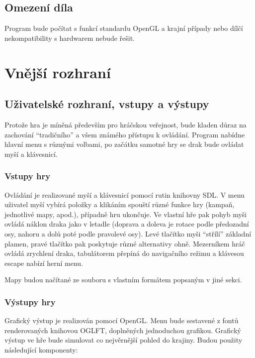 \documentclass{article}
\begin{document}
\subsection{Omezení díla}

Program bude počítat s funkcí standardu OpenGL a krajní případy nebo dílčí nekompatibility s hardwarem nebude řešit.

\section{Vnější rozhraní}

\subsection{Uživatelské rozhraní, vstupy a výstupy}

Protože hra je míněná především pro hráčskou veřejnost, bude kladen důraz na zachování ``tradičního'' a všem známého přístupu k ovládání. Program nabídne hlavní menu s různými volbami, po začátku samotné hry se drak bude ovládat myší a klávesnicí. 

\subsubsection{Vstupy hry}

Ovládání je realizované myší a klávesnicí pomocí rutin knihovny SDL. V menu uživatel myší vybírá položky a klikáním spouští různé funkce hry (kampaň, jednotlivé mapy, apod.), případně hru ukončuje. Ve vlastní hře pak pohyb myši ovládá náklon draka jako v letadle (doprava a doleva je rotace podle předozadní osy, nahoru a dolů poté podle pravolevé osy). Levé tlačítko myši ``střílí'' základní plamen, pravé tlačítko pak poskytuje různé alternativy ohně. Mezerníkem hráč ovládá zrychlení draka, tabulátorem přepíná do navigačního režimu a klávesou escape nabízí herní menu. 

Mapy budou načítané ze souboru s vlastním formátem popsaným v jiné sekci.

\subsubsection{Výstupy hry}

Grafický výstup je realizován pomocí OpenGL. Menu bude sestavené z fontů renderovaných knihovou OGLFT, doplněných jednoduchou grafikou. Grafický výstup ve hře bude simulovat co nejvěrnější pohled do krajiny. Budou použity následující komponenty: 
\end{document}
